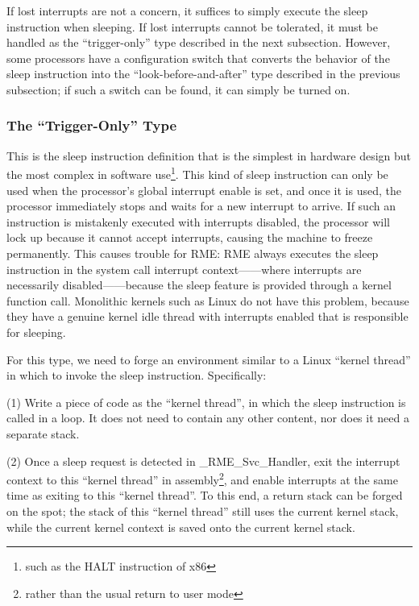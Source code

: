 If lost interrupts are not a concern, it suffices to simply execute the sleep instruction when sleeping. If lost interrupts cannot be tolerated, it must be handled as the ``trigger-only'' type described in the next subsection. However, some processors have a configuration switch that converts the behavior of the sleep instruction into the ``look-before-and-after'' type described in the previous subsection; if such a switch can be found, it can simply be turned on.

\subsubsection{The ``Trigger-Only'' Type}\label{subsubsec:9-sleep-trigger-only}

This is the sleep instruction definition that is the simplest in hardware design but the most complex in software use\footnote{such as the HALT instruction of x86}. This kind of sleep instruction can only be used when the processor's global interrupt enable is set, and once it is used, the processor immediately stops and waits for a new interrupt to arrive. If such an instruction is mistakenly executed with interrupts disabled, the processor will lock up because it cannot accept interrupts, causing the machine to freeze permanently. This causes trouble for RME: RME always executes the sleep instruction in the system call interrupt context------where interrupts are necessarily disabled------because the sleep feature is provided through a kernel function call. Monolithic kernels such as Linux do not have this problem, because they have a genuine kernel idle thread with interrupts enabled that is responsible for sleeping.

For this type, we need to forge an environment similar to a Linux ``kernel thread'' in which to invoke the sleep instruction. Specifically:

(1) Write a piece of code as the ``kernel thread'', in which the sleep instruction is called in a loop. It does not need to contain any other content, nor does it need a separate stack.

(2) Once a sleep request is detected in \_RME\_Svc\_Handler, exit the interrupt context to this ``kernel thread'' in assembly\footnote{rather than the usual return to user mode}, and enable interrupts at the same time as exiting to this ``kernel thread''. To this end, a return stack can be forged on the spot; the stack of this ``kernel thread'' still uses the current kernel stack, while the current kernel context is saved onto the current kernel stack.

